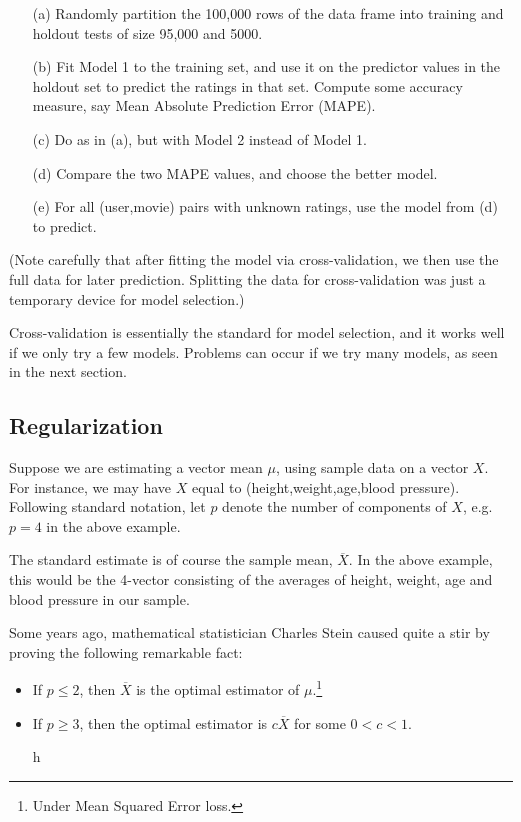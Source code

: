 \begin{itemize}

\item [(a)] Randomly partition the 100,000 rows of the data frame into
training and holdout tests of size 95,000 and 5000.

\item [(b)] Fit Model 1 to the training set, and use it on the predictor
values in the holdout set to predict the ratings in that set.  Compute
some accuracy measure, say Mean Absolute Prediction Error (MAPE).

\item [(c)] Do as in (a), but with Model 2 instead of Model 1.

\item [(d)] Compare the two MAPE values, and choose the better model.

\item [(e)] For all (user,movie) pairs with unknown ratings, use the
model from (d) to predict.

\end{itemize} 

(Note carefully that after fitting the model via cross-validation, we
then use the full data for later prediction.  Splitting the data for
cross-validation was just a temporary device for model selection.)

Cross-validation is essentially the standard for model selection, and it
works well if we only try a few models.  Problems can occur if we try
many models, as seen in the next section.

\subsection{Regularization}

Suppose we are estimating a vector mean $\mu$, using sample data on a
vector $X$.  For instance, we may have $X$ equal to
(height,weight,age,blood pressure).  Following standard notation, let $p$
denote the number of components of $X$, e.g. $p = 4$ in the above
example.

The standard estimate is of course the sample mean, $\overline{X}$.  In
the above example, this would be the 4-vector consisting of the averages
of height, weight, age and blood pressure in our sample.

Some years ago, mathematical statistician Charles Stein caused quite a
stir by proving the following remarkable fact:

\begin{itemize}

\item If $p \leq 2$, then $\overline{X}$ is the optimal estimator of
$\mu$.\footnote{Under Mean Squared Error loss.}

\item If $p \geq 3$, then the optimal estimator is $c \overline{X}$
for some $0 < c < 1$.

h\end{itemize} 


